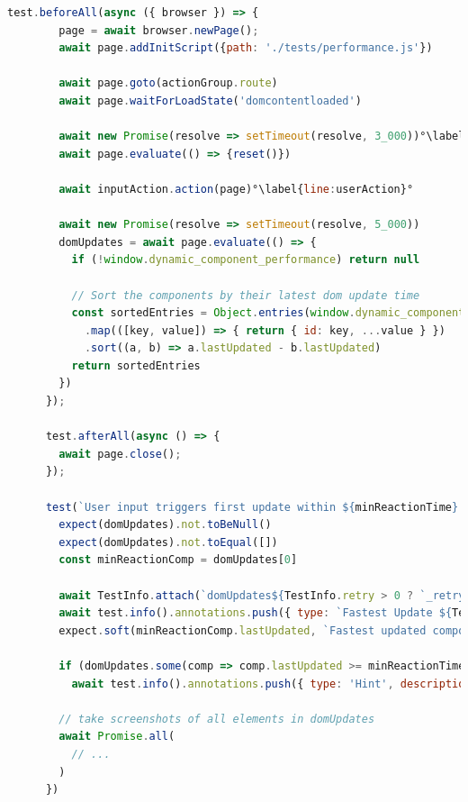 \documentclass[a4paper, 12pt]{article}
\begin{document}
\begin{lstlisting}[caption={Test file for component update times}, label={lst:state-change-spec}, language=JavaScript, escapechar=°]
      test.beforeAll(async ({ browser }) => {
        page = await browser.newPage();
        await page.addInitScript({path: './tests/performance.js'})

        await page.goto(actionGroup.route)
        await page.waitForLoadState('domcontentloaded')

        await new Promise(resolve => setTimeout(resolve, 3_000))°\label{line:actionDelay}°
        await page.evaluate(() => {reset()})

        await inputAction.action(page)°\label{line:userAction}°

        await new Promise(resolve => setTimeout(resolve, 5_000))
        domUpdates = await page.evaluate(() => {
          if (!window.dynamic_component_performance) return null

          // Sort the components by their latest dom update time
          const sortedEntries = Object.entries(window.dynamic_component_performance)
            .map(([key, value]) => { return { id: key, ...value } })
            .sort((a, b) => a.lastUpdated - b.lastUpdated)
          return sortedEntries
        })
      });

      test.afterAll(async () => {
        await page.close();
      });

      test(`User input triggers first update within ${minReactionTime} ms`, { tag: ['@minimalReactionTime'] }, async ({ }, TestInfo) => {
        expect(domUpdates).not.toBeNull()
        expect(domUpdates).not.toEqual([])
        const minReactionComp = domUpdates[0]

        await TestInfo.attach(`domUpdates${TestInfo.retry > 0 ? `_retry_${TestInfo.retry}` : ''}.json`, { body: JSON.stringify(domUpdates, null, 2), contentType: "application/json" })
        await test.info().annotations.push({ type: `Fastest Update ${TestInfo.retry > 0 ? `(retry #${TestInfo.retry})` : ''}`, description: `Component with id ${minReactionComp.id} loaded ${minReactionComp.lastUpdated}ms after user input (xPath: ${minReactionComp.xpath})` });
        expect.soft(minReactionComp.lastUpdated, `Fastest updated component with identifier ${minReactionComp.id} should update within ${minReactionTime} ms`).toBeLessThanOrEqual(minReactionTime)

        if (domUpdates.some(comp => comp.lastUpdated >= minReactionTime))
          await test.info().annotations.push({ type: 'Hint', description: `Screenshots below show slow updating components` });

        // take screenshots of all elements in domUpdates
        await Promise.all(
          // ...
        )
      })


\end{lstlisting}
\end{document}
